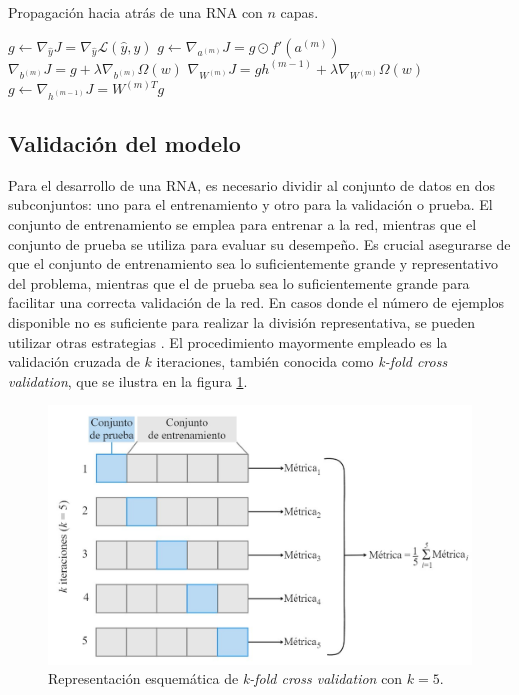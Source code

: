 \begin{algorithm}[H]
	\caption{Propagación hacia atrás de una RNA con $n$ capas.}
	\label{alg:backpropagation}
		\begin{algorithmic}
		\State $g \gets \nabla_{\hat{y}} J = \nabla_{\hat{y}} \mathcal{L}(\hat{y}, y)$ 
		\State $g \gets \nabla_{a^{(m)}} J = g \odot f'(a^{(m)})$ 
		\State $\nabla_{b^{(m)}} J = g + \lambda \nabla_{b^{(m)}} \Omega(w)$ 
		\State $\nabla_{W^{(m)}} J = g h^{(m-1)} + \lambda \nabla_{W^{(m)}} \Omega(w)$ 
		\State $g \gets \nabla_{h^{(m-1)}} J = W^{(m)T}g$ 
		\EndFor
	\end{algorithmic}
\end{algorithm}
\subsection{Validación del modelo}
Para el desarrollo de una RNA, es necesario dividir al conjunto de datos en dos subconjuntos: uno para el 
entrenamiento y otro para la validación o prueba. El conjunto de entrenamiento se emplea para entrenar a 
la red, mientras que el conjunto de prueba se utiliza para evaluar su desempeño. Es crucial asegurarse de 
que el conjunto de entrenamiento sea lo suficientemente grande y representativo del problema, mientras 
que el de prueba sea lo suficientemente grande para facilitar una correcta validación de la red. En casos 
donde el número de ejemplos disponible no es suficiente para realizar la división representativa, se 
pueden utilizar otras estrategias \citep{CITE:42}. 
El procedimiento mayormente empleado es la validación cruzada de $k$ 
iteraciones, también conocida como \emph{k-fold cross validation}, que se ilustra en la figura \ref{fig:crossval}. 

\begin{figure}[h!]
	\centering
	\includegraphics[width=\textwidth]{./Figures/cross_validation.jpg}
	\caption{Representación esquemática de \emph{k-fold cross validation} con $k=5$\protect\footnotemark.}
	\label{fig:crossval}
\end{figure}



